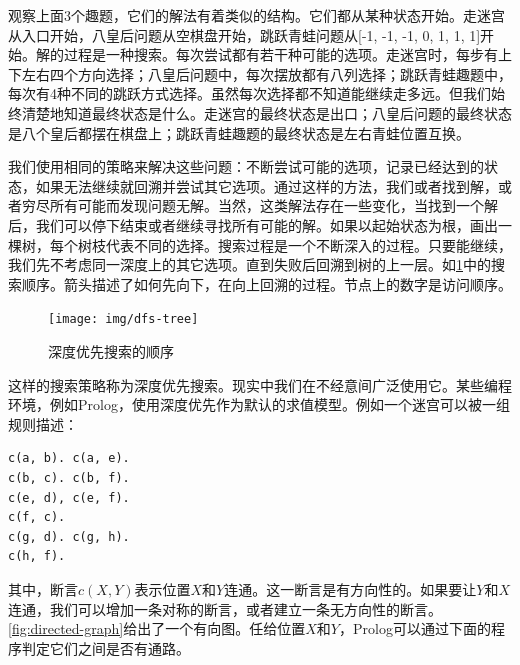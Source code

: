 \documentclass[b5paper]{ctexart}
\begin{document}
观察上面3个趣题，它们的解法有着类似的结构。它们都从某种状态开始。走迷宫从入口开始，八皇后问题从空棋盘开始，跳跃青蛙问题从[-1, -1, -1, 0, 1, 1, 1]开始。解的过程是一种搜索。每次尝试都有若干种可能的选项。走迷宫时，每步有上下左右四个方向选择；八皇后问题中，每次摆放都有八列选择；跳跃青蛙趣题中，每次有4种不同的跳跃方式选择。虽然每次选择都不知道能继续走多远。但我们始终清楚地知道最终状态是什么。走迷宫的最终状态是出口；八皇后问题的最终状态是八个皇后都摆在棋盘上；跳跃青蛙趣题的最终状态是左右青蛙位置互换。

我们使用相同的策略来解决这些问题：不断尝试可能的选项，记录已经达到的状态，如果无法继续就回溯并尝试其它选项。通过这样的方法，我们或者找到解，或者穷尽所有可能而发现问题无解。当然，这类解法存在一些变化，当找到一个解后，我们可以停下结束或者继续寻找所有可能的解。如果以起始状态为根，画出一棵树，每个树枝代表不同的选择。搜索过程是一个不断深入的过程。只要能继续，我们先不考虑同一深度上的其它选项。直到失败后回溯到树的上一层。如\cref{fig:dfs-tree}中的搜索顺序。箭头描述了如何先向下，在向上回溯的过程。节点上的数字是访问顺序。

\begin{figure}[htbp]
 \centering
 \texttt{[image: img/dfs-tree]}
 \caption{深度优先搜索的顺序}
 \label{fig:dfs-tree}
\end{figure}

这样的搜索策略称为深度优先搜索。现实中我们在不经意间广泛使用它。某些编程环境，例如Prolog，使用深度优先作为默认的求值模型。例如一个迷宫可以被一组规则描述：

\lstset{language=Prolog}
\begin{lstlisting}
c(a, b). c(a, e).
c(b, c). c(b, f).
c(e, d), c(e, f).
c(f, c).
c(g, d). c(g, h).
c(h, f).
\end{lstlisting}

其中，断言$c(X, Y)$表示位置$X$和$Y$连通。这一断言是有方向性的。如果要让$Y$和$X$连通，我们可以增加一条对称的断言，或者建立一条无方向性的断言。\cref{fig:directed-graph}给出了一个有向图。任给位置$X$和$Y$，Prolog可以通过下面的程序判定它们之间是否有通路。
\end{document}
